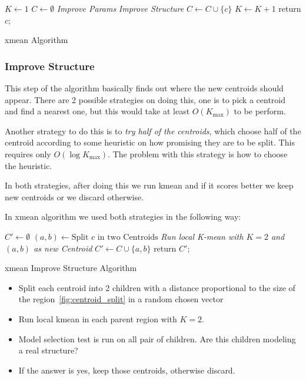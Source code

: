 \documentclass[12pt, a4paper]{article}
\begin{document}
\begin{algorithm}[H]
  $K \longleftarrow 1$\;
  $C \longleftarrow \emptyset$\;
  {\emph{Improve Params} \;
    \emph{Improve Structure} \;
    {$C \longleftarrow C \cup \{c\}$
    }
    $K \longleftarrow K + 1$
  }
  return $c$;
  \caption{\acrshort{xmean} Algorithm}
\end{algorithm}

\subsubsection{Improve Structure}\label{sub:sub:imp:struct}
This step of the algorithm basically finds out where the new centroids should appear. There are 2 possible strategies on doing this, one is to pick a centroid and find a nearest one, but this would take at least $O(K_{\text{max}})$ to be perform.

Another strategy to do this is to \textit{try half of the centroids}, which choose half of the centroid according to some heuristic on how promising they are to be split. This requires only $O(\log{K_{\text{max}}})$. The problem with this strategy is how to choose the heuristic.

In both strategies, after doing this we run \acrlong{kmean} and if it scores better we keep new centroids or we discard otherwise.

In \acrlong{xmean} algorithm we used both strategies in the following way:

\begin{algorithm}[H]
  $C' \longleftarrow \emptyset$\;
  {$(a,b) \longleftarrow \text{Split } c \text{ in two Centroids}$\;
    \emph{Run local K-mean with $K = 2$ and $(a,b)$ as new Centroid}\;
    {$C' \longleftarrow C \cup \{a,b\}$
    }
  }
  return $C'$;
  \caption{\acrshort{xmean} Improve Structure Algorithm}
\end{algorithm}



\begin{itemize}
  \item Split each centroid into 2 children with a distance proportional to the size of the region~\ref{fig:centroid_split} in a random chosen vector
  \item Run local \acrlong{kmean} in each parent region with $K = 2$.
  \item Model selection test is run on all pair of children. Are this children modeling a real structure?
  \item If the answer is yes, keep those centroids, otherwise discard.
\end{itemize}
\end{document}

